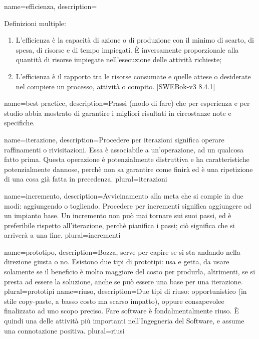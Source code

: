 {
name=efficienza,
description={Definizioni multiple: 
\begin{enumerate}
\item L'efficienza \`e la capacit\`a di azione o di produzione con il minimo di scarto, di spesa, di risorse e di tempo impiegati. \`E inversamente proporzionale alla quantit\`a di risorse impiegate nell'esecuzione delle attivit\`a richieste;
\item L'efficienza \`e il rapporto tra le risorse consumate e quelle attese o desiderate nel compiere un processo, attivit\`a o compito. [SWEBok-v3 8.4.1]
\end{enumerate}
}
}

{
name=best practice,
description={Prassi (modo di fare) che per esperienza e per studio abbia mostrato di garantire i migliori risultati in circostanze note e specifiche.}
}

{
name=iterazione,
description={Procedere per iterazioni significa operare raffinamenti o rivisitazioni. Essa \`e associabile a un'operazione, ad un qualcosa fatto prima. Questa operazione \`e potenzialmente distruttiva e ha caratteristiche potenzialmente dannose, perch\`e non sa garantire come finir\`a ed \`e una ripetizione di una cosa gi\`a fatta in precedenza.}
plural=iterazioni
}

{
name=incremento,
description={Avvicinamento alla meta che si compie in due modi: aggiungendo o togliendo. Procedere per incrementi significa aggiungere ad un impianto base. Un incremento non pu\`o mai tornare sui suoi passi, ed \`e preferibile rispetto all'iterazione, perch\`e pianifica i passi; ci\`o significa che si arriver\`a a una fine.}
plural=incrementi
}

{
name=prototipo,
description={Bozza, serve per capire se si sta andando nella direzione giusta o no. Esistono due tipi di prototipi: usa e getta, da usare solamente se il beneficio \`e molto maggiore del costo per produrla, altrimenti, se si presta ad essere la soluzione, anche se pu\`o essere una base per una iterazione.}
plural=prototipi
}
{
name=riuso,
description={Due tipi di riuso: opportunistico (in stile copy-paste, a basso costo ma scarso impatto), oppure consapevolee finalizzato ad uno scopo preciso. Fare software \`e fondalmentalmente riuso. \`E quindi una delle attivit\`a pi\`u importanti nell'Ingegneria del Software, e assume una connotazione positiva.}
plural=riusi
}

